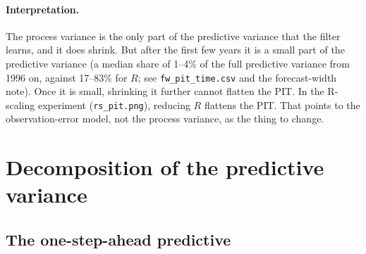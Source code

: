 \documentclass[11pt]{article}
\newcommand{\code}[1]{\texttt{#1}}
\begin{document}
\paragraph{Interpretation.}
The process variance is the only part of the predictive variance that the filter learns,
and it does shrink. But after the first few years it is a small part of the predictive
variance (a median share of 1--4\% of the full predictive variance from 1996 on, against 17--83\% for $R$;
see \code{fw\_pit\_time.csv} and the forecast-width note). Once it is small, shrinking it further
cannot flatten the PIT. In the R-scaling experiment (\code{rs\_pit.png}), reducing $R$
flattens the PIT. That points to the observation-error model, not the process variance, as
the thing to change.

\section{Decomposition of the predictive variance}
\label{sec:decomp}

\subsection{The one-step-ahead predictive}
\end{document}
